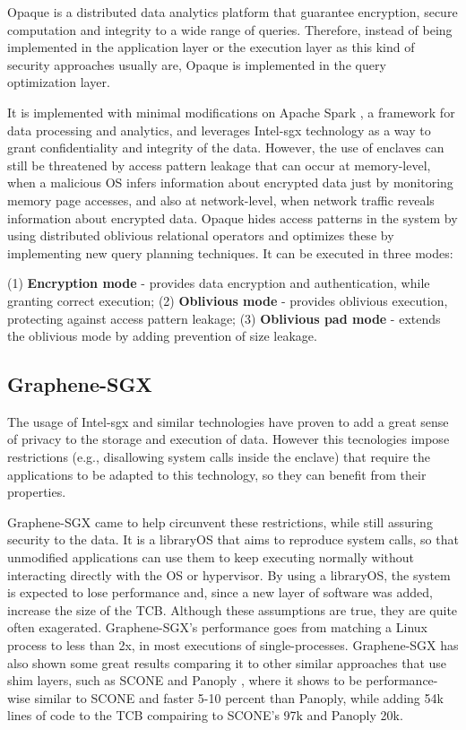 Opaque \cite{opaquePaper} is a distributed data analytics platform that guarantee encryption, secure computation and integrity to a wide range of queries. Therefore, instead of being implemented in the application layer or the execution layer as this kind of security approaches usually are, Opaque is implemented in the query optimization layer. 

It is implemented with minimal modifications on Apache Spark \cite{apacheSparkPaper}, a framework for data processing and analytics, and leverages Intel-\gls{sgx} technology as a way to grant confidentiality and integrity of the data. 
However, the use of enclaves can still be threatened by access pattern leakage that can occur at memory-level, when a malicious OS infers information about encrypted data just by monitoring memory page accesses, and also at network-level, when network traffic reveals information about encrypted data.
Opaque hides access patterns in the system by using distributed oblivious relational operators and optimizes these by implementing new query planning techniques. It can be executed in three modes: 

(1) \textbf{Encryption mode} - provides data encryption and authentication, while granting correct execution;
(2) \textbf{Oblivious mode} - provides oblivious execution, protecting against access pattern leakage;
(3) \textbf{Oblivious pad mode} - extends the oblivious mode by adding prevention of size leakage.


\subsection{Graphene-SGX}
\label{ssec:grapheneSGX}

The usage of Intel-\gls{sgx} and similar technologies have proven to add a great sense of privacy to the storage and execution of data. However this tecnologies impose restrictions (e.g., disallowing system calls inside the enclave) that require the applications to be  adapted to this technology, so they can benefit from their properties. 

Graphene-SGX \cite{graphenePaper} came to help circunvent these restrictions, while still assuring security to the data. It is a libraryOS that aims to reproduce system calls, so that unmodified applications can use them to keep executing normally without interacting directly with the OS or hypervisor. 
By using a libraryOS, the system is expected to lose performance and, since a new layer of software was added, increase the size of the TCB. 
Although these assumptions are true, they are quite often exagerated. Graphene-SGX's performance goes from matching a Linux process to less than 2x, in most executions of single-processes.
Graphene-SGX has also shown some great results comparing it to other similar approaches that use shim layers, such as SCONE \cite{sconePaper} and Panoply \cite{panoplyPaper}, where it shows to be performance-wise similar to SCONE and faster 5-10 percent than Panoply, while adding 54k lines of code to the TCB compairing to SCONE's 97k and Panoply 20k.


